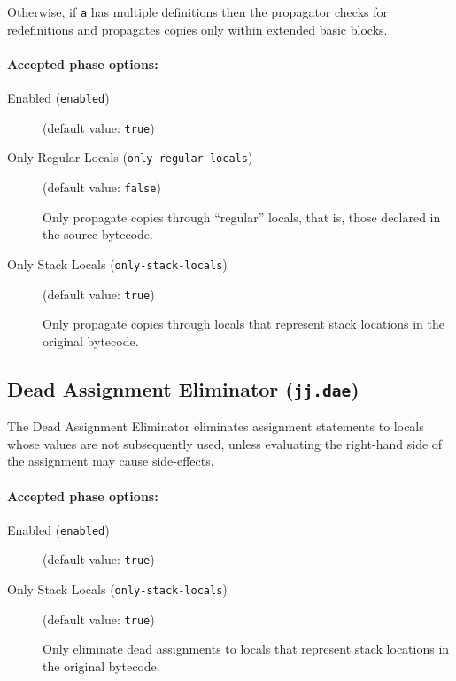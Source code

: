 \documentclass{article}
\begin{document}
Otherwise, if {\tt a} has multiple definitions then the
propagator checks for redefinitions and propagates copies
only within extended basic blocks.


\paragraph{Accepted phase options:} 

\begin{description}

\item[Enabled ({\tt enabled})]
(default value: {\tt true})






\item[Only Regular Locals ({\tt only-regular-locals})]
(default value: {\tt false})




Only propagate copies through ``regular'' locals, that is,
those declared in the source bytecode.



\item[Only Stack Locals ({\tt only-stack-locals})]
(default value: {\tt true})




Only propagate copies through locals that represent stack locations in
the original bytecode.



\end{description}

\subsection{Dead Assignment Eliminator ({\tt jj.dae})}

The Dead Assignment Eliminator eliminates assignment statements
to locals whose values are not subsequently used, unless
evaluating the right-hand side of the assignment may cause
side-effects.


\paragraph{Accepted phase options:} 

\begin{description}

\item[Enabled ({\tt enabled})]
(default value: {\tt true})






\item[Only Stack Locals ({\tt only-stack-locals})]
(default value: {\tt true})




Only eliminate dead assignments to locals that represent stack
locations in the original bytecode.



\end{description}
\end{document}
